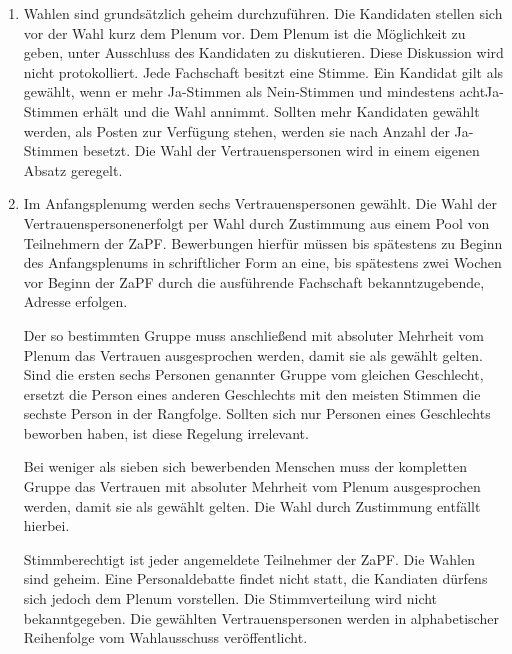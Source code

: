 \documentclass[draft,12pt,oneside]{scrreprt}
\begin{document}
\begin{enumerate}
  \item Wahlen sind grundsätzlich geheim durchzuführen.
        Die Kandidaten stellen sich vor der Wahl kurz dem Plenum vor.
        Dem Plenum ist die Möglichkeit zu geben, unter Ausschluss des Kandidaten
        zu diskutieren.
        Diese Diskussion wird nicht protokolliert.
        Jede Fachschaft besitzt eine Stimme.
        Ein Kandidat gilt als gewählt, wenn er mehr Ja-Stimmen als Nein-Stimmen
        und mindestens acht\footnotemark Ja-Stimmen erhält und die Wahl annimmt.
        Sollten mehr Kandidaten gewählt werden, als Posten zur Verfügung stehen,
        werden sie nach Anzahl der Ja-Stimmen besetzt.
        Die Wahl der Vertrauenspersonen wird in einem eigenen Absatz geregelt.


  \item Im Anfangsplenumg werden sechs Vertrauenspersonen gewählt.
        Die Wahl der Vertrauenspersonen\footnotemark erfolgt per Wahl durch
        Zustimmung aus einem Pool von Teilnehmern der ZaPF.
        Bewerbungen hierfür müssen bis spätestens zu Beginn des Anfangsplenums
        in schriftlicher Form an eine, bis spätestens zwei Wochen vor Beginn der
        ZaPF durch die ausführende Fachschaft bekanntzugebende, Adresse erfolgen.

        Der so bestimmten Gruppe muss anschließend mit absoluter Mehrheit vom
        Plenum das Vertrauen ausgesprochen werden, damit sie als gewählt gelten.
        Sind die ersten sechs Personen genannter Gruppe vom gleichen Geschlecht,
        ersetzt die Person eines anderen Geschlechts mit den meisten Stimmen die
        sechste Person in der Rangfolge.
        Sollten sich nur Personen eines Geschlechts beworben haben, ist diese
        Regelung irrelevant.

        Bei weniger als sieben sich bewerbenden Menschen muss der kompletten Gruppe
        das Vertrauen mit absoluter Mehrheit vom Plenum ausgesprochen werden,
        damit sie als gewählt gelten.
        Die Wahl durch Zustimmung entfällt hierbei.

        Stimmberechtigt ist jeder angemeldete Teilnehmer der ZaPF.
        Die Wahlen sind geheim.
        Eine Personaldebatte findet nicht statt, die Kandiaten dürfens sich
        jedoch dem Plenum vorstellen.
        Die Stimmverteilung wird nicht bekanntgegeben.
        Die gewählten Vertrauenspersonen werden in alphabetischer Reihenfolge
        vom Wahlausschuss veröffentlicht.


\end{enumerate}
\end{document}
